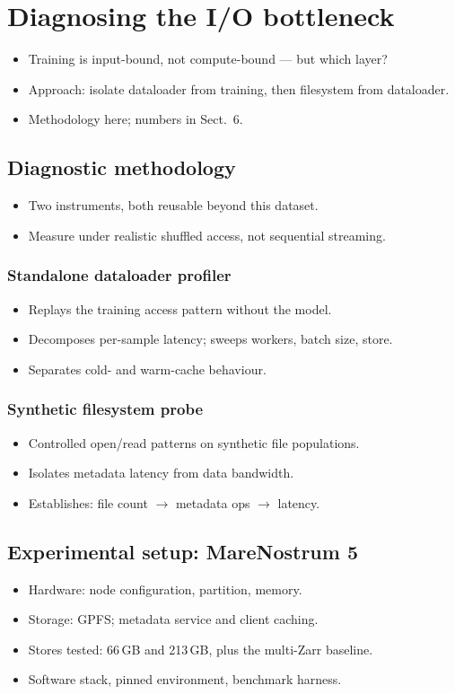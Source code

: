 \documentclass[gmd, manuscript]{copernicus}
\begin{document}
\section{Diagnosing the I/O bottleneck}
\begin{itemize}
\item Training is input-bound, not compute-bound --- but which layer?
\item Approach: isolate dataloader from training, then filesystem from dataloader.
\item Methodology here; numbers in Sect.~6.
\end{itemize}
\subsection{Diagnostic methodology}
\begin{itemize}
\item Two instruments, both reusable beyond this dataset.
\item Measure under realistic shuffled access, not sequential streaming.
\end{itemize}
\subsubsection{Standalone dataloader profiler}
\begin{itemize}
\item Replays the training access pattern without the model.
\item Decomposes per-sample latency; sweeps workers, batch size, store.
\item Separates cold- and warm-cache behaviour.
\end{itemize}
\subsubsection{Synthetic filesystem probe}
\begin{itemize}
\item Controlled open/read patterns on synthetic file populations.
\item Isolates metadata latency from data bandwidth.
\item Establishes: file count $\rightarrow$ metadata ops $\rightarrow$ latency.
\end{itemize}
\subsection{Experimental setup: MareNostrum 5}
\begin{itemize}
\item Hardware: node configuration, partition, memory.
\item Storage: GPFS; metadata service and client caching.
\item Stores tested: 66\,GB and 213\,GB, plus the multi-Zarr baseline.
\item Software stack, pinned environment, benchmark harness.
\end{itemize}
\end{document}
